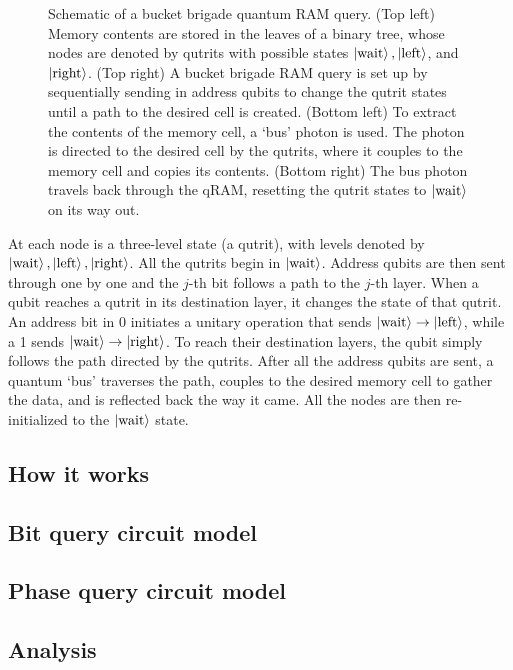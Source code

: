 \documentclass[a4paper,10pt]{article}
\begin{document}
{{\begin{figure}
\begin{subfigure}
    \end{subfigure}
    \caption{Schematic of a bucket brigade quantum RAM query. (Top left) Memory contents are stored in the leaves of a binary tree, whose nodes are denoted by qutrits with possible states $\ket{\hbox{wait}}, \ket{\hbox{left}}$, and $\ket{\hbox{right}}$. (Top right) A bucket brigade RAM query is set up by sequentially sending in address qubits to change the qutrit states until a path to the desired cell is created. (Bottom left) To extract the contents of the memory cell, a `bus' photon is used. The photon is directed to the desired cell by the qutrits, where it couples to the memory cell and copies its contents. (Bottom right) The bus photon travels back through the qRAM, resetting the qutrit states to $\ket{\hbox{wait}}$ on its way out.}
\end{figure}


At each node is a three-level state (a qutrit), with levels denoted by $\ket{\hbox{wait}}, \ket{\hbox{left}}, \ket{\hbox{right}}$. All the qutrits begin in $\ket{\hbox{wait}}$. Address qubits are then sent through one by one and the $j$-th bit follows a path to the $j$-th layer. When a qubit reaches a qutrit in its destination layer, it changes the state of that qutrit. An address bit in 0 initiates a unitary operation that sends $\ket{\hbox{wait}} \rightarrow \ket{\hbox{left}}$, while a 1 sends $\ket{\hbox{wait}} \rightarrow \ket{\hbox{right}}$. To reach their destination layers, the qubit simply follows the path directed by the qutrits. After all the address qubits are sent, a quantum `bus' traverses the path, couples to the desired memory cell to gather the data, and is reflected back the way it came. All the nodes are then re-initialized to the $\ket{\hbox{wait}}$ state.


\subsection{How it works}

\subsection{Bit query circuit model}

\subsection{Phase query circuit model}

\subsection{Analysis}


}}
\end{document}
